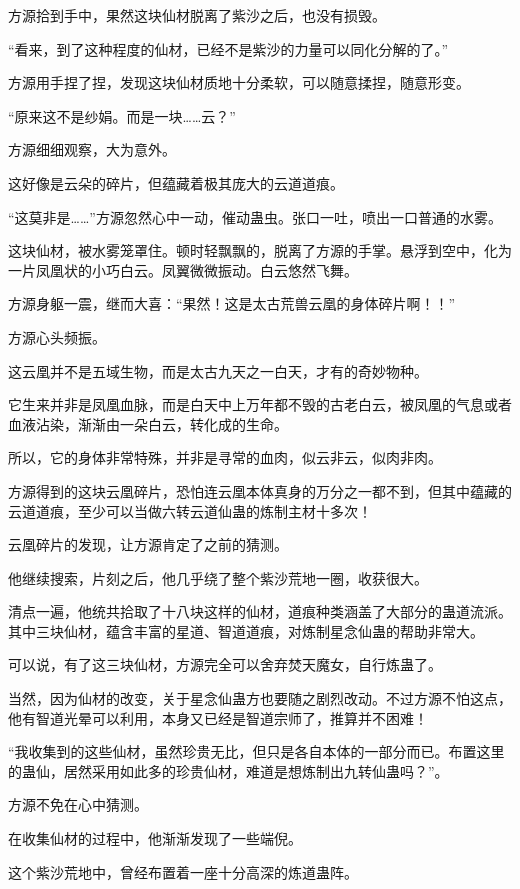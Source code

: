 \begin{this_body}
方源拾到手中，果然这块仙材脱离了紫沙之后，也没有损毁。

“看来，到了这种程度的仙材，已经不是紫沙的力量可以同化分解的了。”

方源用手捏了捏，发现这块仙材质地十分柔软，可以随意揉捏，随意形变。

“原来这不是纱娟。而是一块……云？”

方源细细观察，大为意外。

这好像是云朵的碎片，但蕴藏着极其庞大的云道道痕。

“这莫非是……”方源忽然心中一动，催动蛊虫。张口一吐，喷出一口普通的水雾。

这块仙材，被水雾笼罩住。顿时轻飘飘的，脱离了方源的手掌。悬浮到空中，化为一片凤凰状的小巧白云。凤翼微微振动。白云悠然飞舞。

方源身躯一震，继而大喜：“果然！这是太古荒兽云凰的身体碎片啊！！”

方源心头频振。

这云凰并不是五域生物，而是太古九天之一白天，才有的奇妙物种。

它生来并非是凤凰血脉，而是白天中上万年都不毁的古老白云，被凤凰的气息或者血液沾染，渐渐由一朵白云，转化成的生命。

所以，它的身体非常特殊，并非是寻常的血肉，似云非云，似肉非肉。

方源得到的这块云凰碎片，恐怕连云凰本体真身的万分之一都不到，但其中蕴藏的云道道痕，至少可以当做六转云道仙蛊的炼制主材十多次！

云凰碎片的发现，让方源肯定了之前的猜测。

他继续搜索，片刻之后，他几乎绕了整个紫沙荒地一圈，收获很大。

清点一遍，他统共拾取了十八块这样的仙材，道痕种类涵盖了大部分的蛊道流派。其中三块仙材，蕴含丰富的星道、智道道痕，对炼制星念仙蛊的帮助非常大。

可以说，有了这三块仙材，方源完全可以舍弃焚天魔女，自行炼蛊了。

当然，因为仙材的改变，关于星念仙蛊方也要随之剧烈改动。不过方源不怕这点，他有智道光晕可以利用，本身又已经是智道宗师了，推算并不困难！

“我收集到的这些仙材，虽然珍贵无比，但只是各自本体的一部分而已。布置这里的蛊仙，居然采用如此多的珍贵仙材，难道是想炼制出九转仙蛊吗？”。

方源不免在心中猜测。

在收集仙材的过程中，他渐渐发现了一些端倪。

这个紫沙荒地中，曾经布置着一座十分高深的炼道蛊阵。


\end{this_body}
